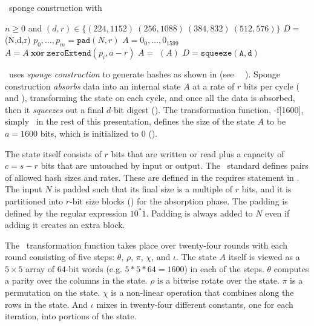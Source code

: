 \begin{algorithm}[t]
  \caption{\shaThree\ sponge construction with \keccak}\label{alg:sha3}
  \begin{algorithmic}[1]
    \Require $n \geq 0$ and $(d,r) \in \{(224, 1152)\ (256, 1088)\ (384, 832)\ (512, 576)\}$
    \Ensure $D =$ \shaThree(N,d,r)
    \State $p_0, \ldots, p_m = \mathtt{pad}(N, r)$\label{line:pad}
    \State $A = 0_0, \ldots, 0_{1599}$\label{line:initkeccak}
      \State $A = A\ \mathbf{xor}\ \mathtt{zeroExtend}(p_i, a-r)$\label{line:absorb}
      \State $A =$ \keccak$(A)$\label{line:keccak}
    \EndFor
    \State $D = \mathtt{squeeze(A,d)}$\label{line:squeeze}
  \end{algorithmic}
\end{algorithm}

\shaThree\ uses \emph{sponge construction} to generate hashes as shown in  (see \nist\ \fips\ \cite{fips202}).
Sponge construction \emph{absorbs} data into an internal state $A$ at a rate of $r$ bits per cycle ( and ), transforming the state on each cycle, and once all the data is absorbed, then it \emph{squeezes} out a final $d$-bit digest ().
The transformation function, \keccak-f[1600], simply \keccak\ in the rest of this presentation, defines the size of the state $A$ to be $a = 1600$ bits, which is initialized to 0 ().

The state itself consists of $r$ bits that are written or read plus a capacity of $c = s - r$ bits that are untouched by input or output.
The \nist\ standard defines pairs of allowed hash sizes and rates.
These are defined in the requires statement in . 
The input $N$ is padded such that its final size is a multiple of $r$ bits, and it is partitioned into $r$-bit size blocks () for the absorption phase.
The padding is defined by the regular expression $10^*1$.
Padding is always added to $N$ even if adding it creates an extra block.

The \keccak\ transformation function takes place over twenty-four rounds with each round consisting of five steps: $\theta$, $\rho$, $\pi$, $\chi$, and $\iota$.
The state $A$ itself is viewed as a $5 \times 5$ array of $64$-bit words (e.g. $5 * 5 * 64 = 1600$) in each of the steps.
$\theta$ computes a parity over the columns in the state. $\rho$ is a bitwise rotate over the state.
$\pi$ is a permutation on the state. $\chi$ is a non-linear operation that combines along the rows in the state.
And $\iota$ mixes in twenty-four different constants, one for each iteration, into portions of the state.
